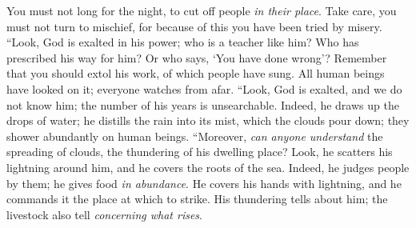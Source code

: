 \begin{biblechapter}
\verse You must not long for the night, 
to cut off people \textit{in their place}.
\verse Take care, you must not turn to mischief, 
for because of this you have been tried by misery.
\verse “Look, God is exalted in his power; 
who is a teacher like him?
\verse Who has prescribed his way for him? 
Or who says, ‘You have done wrong’?
\verse Remember that you should extol his work, 
of which people have sung.
\verse All human beings have looked on it; 
everyone watches from afar.
\verse “Look, God is exalted, and we do not know him; 
the number of his years is unsearchable.
\verse Indeed, he draws up the drops of water; 
he distills the rain into its mist,
\verse which the clouds pour down; 
they shower abundantly on human beings.
\verse “Moreover, \textit{can anyone understand} the spreading of clouds, 
the thundering of his dwelling place?
\verse Look, he scatters his lightning around him, 
and he covers the roots of the sea.
\verse Indeed, he judges people by them; 
he gives food \textit{in abundance}.
\verse He covers his hands with lightning, 
and he commands it the place at which to strike.
\verse His thundering tells about him; 
the livestock also tell \textit{concerning what rises}.
\end{biblechapter}


